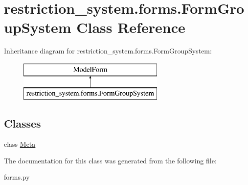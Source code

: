 \hypertarget{classrestriction__system_1_1forms_1_1FormGroupSystem}{}\section{restriction\+\_\+system.\+forms.\+Form\+Group\+System Class Reference}
\label{classrestriction__system_1_1forms_1_1FormGroupSystem}
Inheritance diagram for restriction\+\_\+system.\+forms.\+Form\+Group\+System\+:\begin{figure}[H]
\begin{center}
\leavevmode
\includegraphics[height=2.000000cm]{classrestriction__system_1_1forms_1_1FormGroupSystem}
\end{center}
\end{figure}
\subsection*{Classes}
\begin{DoxyCompactItemize}
\item 
class \hyperlink{classrestriction__system_1_1forms_1_1FormGroupSystem_1_1Meta}{Meta}
\end{DoxyCompactItemize}


The documentation for this class was generated from the following file\+:\begin{DoxyCompactItemize}
\item 
forms.\+py\end{DoxyCompactItemize}
